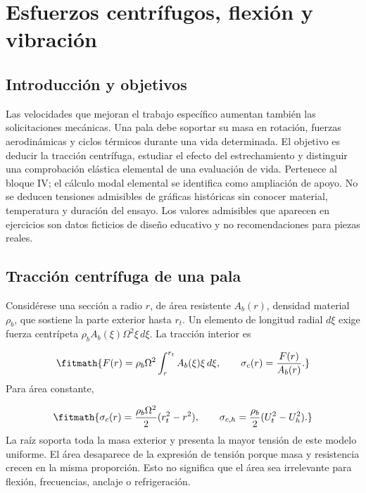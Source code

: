 \documentclass[10pt,openany]{book}
\begin{document}
\chapter{Esfuerzos centrífugos, flexión y vibración}
\label{chap:c13}


\section{Introducción y objetivos}

Las velocidades que mejoran el trabajo específico aumentan también las solicitaciones mecánicas. Una pala debe soportar su masa en rotación, fuerzas aerodinámicas y ciclos térmicos durante una vida determinada. El objetivo es deducir la tracción centrífuga, estudiar el efecto del estrechamiento y distinguir una comprobación elástica elemental de una evaluación de vida. Pertenece al bloque IV; el cálculo modal elemental se identifica como ampliación de apoyo.
No se deducen tensiones admisibles de gráficas históricas sin conocer material, temperatura y duración del ensayo. Los valores admisibles que aparecen en ejercicios son datos ficticios de diseño educativo y no recomendaciones para piezas reales.

\section{Tracción centrífuga de una pala}

Considérese una sección a radio \(r\), de área resistente \(A_b(r)\), densidad material \(\rho_b\), que sostiene la parte exterior hasta \(r_t\). Un elemento de longitud radial \(d\xi\) exige fuerza centrípeta \(\rho_bA_b(\xi)\Omega^2\xi\,d\xi\). La tracción interior es

\[
\fitmath{F(r)=\rho_b\Omega^2\int_r^{r_t}A_b(\xi)\xi\,d\xi,\qquad
\sigma_c(r)=\frac{F(r)}{A_b(r)}.}
\]
Para área constante,

\[
\fitmath{\sigma_c(r)=\frac{\rho_b\Omega^2}{2}(r_t^2-r^2),\qquad
\sigma_{c,h}=\frac{\rho_b}{2}(U_t^2-U_h^2).}
\]
La raíz soporta toda la masa exterior y presenta la mayor tensión de este modelo uniforme. El área desaparece de la expresión de tensión porque masa y resistencia crecen en la misma proporción. Esto no significa que el área sea irrelevante para flexión, frecuencias, anclaje o refrigeración.
\end{document}
